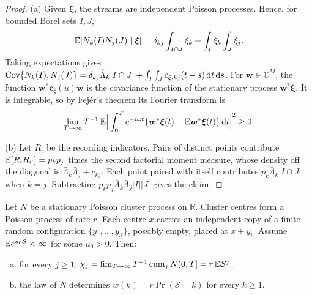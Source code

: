 \begin{proof}
(a) Given $\bm\xi$, the streams are independent Poisson processes. Hence, for bounded
Borel sets $I,J$,
\[
\mathbb{E}[N_k(I)N_j(J)\mid\bm\xi]=\delta_{kj}\int_{I\cap J}\xi_k
+\int_I\xi_k\int_J\xi_j .
\]
Taking expectations gives
$\operatorname{Cov}\{N_k(I),N_j(J)\}=\delta_{kj}\bar\Lambda_k|I\cap J|+\int_I\int_J c_{\xi,kj}(t-s)\,\mathrm{d} t\,\mathrm{d} s$.
For $\bm w\in\mathbb C^M$, the function $\bm w^*\bm c_\xi(u)\bm w$ is the covariance
function of the stationary process $\bm w^*\bm\xi$. It is integrable, so by Fej\'er's
theorem its Fourier transform is
\[
\lim_{T\to\infty}T^{-1}\,\mathbb{E}\Big|\int_0^Te^{-i\omega t}\{\bm w^*\bm\xi(t)-\mathbb{E}\bm w^*\bm\xi(t)\}\,\mathrm{d} t\Big|^2\ge0 .
\]

(b) Let $R_i$ be the recording indicators. Pairs of distinct points contribute
$\mathbb{E}[R_iR_{i'}]=p_kp_j$ times the second factorial moment measure, whose density off the
diagonal is $\bar\Lambda_k\bar\Lambda_j+c_{kj}$. Each point paired with itself
contributes $p_k\bar\Lambda_k|I\cap J|$ when $k=j$. Subtracting
$p_kp_j\bar\Lambda_k\bar\Lambda_j|I||J|$ gives the claim.
\end{proof}

\begin{lemma}\label{lem:th-cluster}
Let $N$ be a stationary Poisson cluster process on $\mathbb R$. Cluster centres form a
Poisson process of rate $r$. Each centre $x$ carries an independent copy of a finite
random configuration $\{y_1,\dots,y_{\mathcal S}\}$, possibly empty, placed at $x+y_i$. Assume
$\mathbb{E} e^{u_0\mathcal S}<\infty$ for some $u_0>0$. Then:
\begin{enumerate}[(a)]
  \item for every $j\ge1$,
  $\chi_j=\lim_{T\to\infty}T^{-1}\operatorname{cum}_jN(0,T]=r\,\mathbb{E} \mathcal S^j$;
  \item the law of $N$ determines $w(k)=r\Pr(\mathcal S=k)$ for every $k\ge1$.
\end{enumerate}
\end{lemma}


